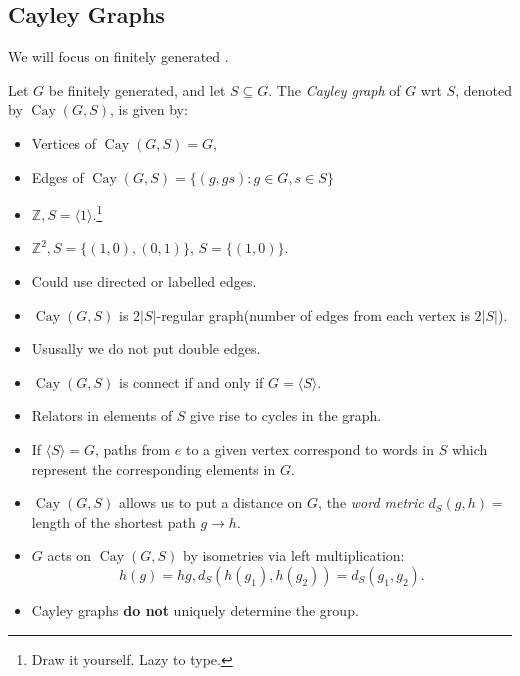 \documentclass[a4paper]{article}
\begin{document}
\subsection{Cayley Graphs}
We will focus on finitely generated .
\begin{definition}
  Let $G$ be finitely generated, and let $ S \subseteq G $. The
  \textit{Cayley graph} of $G$ wrt $S$, denoted by $
  \operatorname{Cay}(G,S)  $, is given by:
  \begin{itemize}
    \item Vertices of $ \operatorname{Cay}(G,S)=G  $,
    \item Edges of $ \operatorname{Cay}(G,S)=\{(g,gs):g\in G,s\in S\} $
  \end{itemize}
\end{definition}
\begin{example}
  \begin{itemize}
    \item $ \mathbb{Z}, S= \langle 1 \rangle $.\footnote{Draw it
      yourself. Lazy to type.}
    \item $ \mathbb{Z}^2,S=\{(1,0),(0,1)\} $, $ S=\{(1,0)\} $.
  \end{itemize}
\end{example}
\begin{remark}
  \begin{itemize}
    \item Could use directed or labelled edges.
    \item $ \operatorname{Cay}(G,S)  $ is $ 2|S| $-regular
      graph(number of edges from each vertex is $ 2|S| $).
    \item Ususally we do not put double edges.
    \item $ \operatorname{Cay}(G,S)  $ is connect if and only if $
      G=\langle S \rangle $.
    \item Relators in elements of $S$ give rise to cycles in the graph.
    \item If $ \langle S \rangle =G $, paths from $e$ to a given
      vertex correspond to words in $S$ which represent the
      corresponding elements in $G$.
    \item $ \operatorname{Cay}(G,S)  $ allows us to put a distance on
      $G$, the \textit{word metric} $ d_S(g,h) = $ length of the
      shortest path $ g\to h $.
    \item $G$ acts on $ \operatorname{Cay}(G,S)  $ by isometries via
      left multiplication:
      \[
        h(g)=hg, d_S(h(g_1),h(g_2))=d_S(g_1,g_2) .
      \]
    \item Cayley graphs \textbf{do not} uniquely determine the group.
  \end{itemize}
\end{remark}
\end{document}
